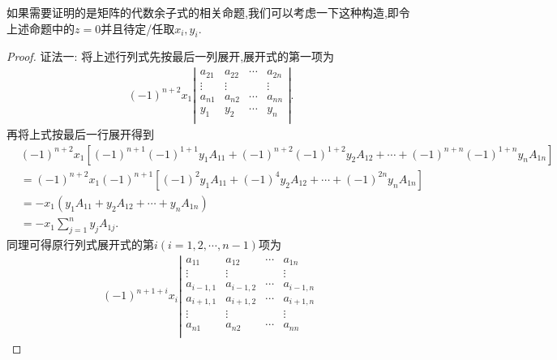 \documentclass[lang=cn,newtx,10pt,scheme=chinese]{elegantbook}
\begin{document}
\begin{remark}
如果需要证明的是矩阵的代数余子式的相关命题,我们可以考虑一下这种构造,即令上述命题中的$z=0$并且待定/任取$x_i,y_i$.
\end{remark}
\begin{proof}
{\color{blue}证法一:}
将上述行列式先按最后一列展开,展开式的第一项为
\begin{equation}
\begin{split}
\left( -1 \right) ^{n+2}x_1\left| \begin{matrix}
a_{21}&		a_{22}&		\cdots&		a_{2n}\\
\vdots&		\vdots&		&		\vdots\\
a_{n1}&		a_{n2}&		\cdots&		a_{nn}\\
y_1&		y_2&		\cdots&		y_n\\
\end{matrix} \right|.
\end{split}
\nonumber
\end{equation}
再将上式按最后一行展开得到
\begin{equation}
\begin{split}
&\left( -1 \right) ^{n+2}x_1\left[ \left( -1 \right) ^{n+1}\left( -1 \right) ^{1+1}y_1A_{11}+\left( -1 \right) ^{n+2}\left( -1 \right) ^{1+2}y_2A_{12}+\cdots +\left( -1 \right) ^{n+n}\left( -1 \right) ^{1+n}y_nA_{1n} \right]
\\
&=\left( -1 \right) ^{n+2}x_1\left( -1 \right) ^{n+1}\left[ \left( -1 \right) ^2y_1A_{11}+\left( -1 \right) ^4y_2A_{12}+\cdots +\left( -1 \right) ^{2n}y_nA_{1n} \right] 
\\
&=-x_1\left( y_1A_{11}+y_2A_{12}+\cdots +y_nA_{1n} \right)
\\
&=-x_1\sum_{j=1}^n{y_jA_{1j}}.            
\end{split}
\nonumber
\end{equation}
同理可得原行列式展开式的第$i(i=1,2,\cdots,n-1)$项为
\begin{equation}
\begin{split}
\left( -1 \right) ^{n+1+i}x_i\left| \begin{matrix}
a_{11}&		a_{12}&		\cdots&		a_{1n}\\
\vdots&		\vdots&		&		\vdots\\
a_{i-1,1}&		a_{i-1,2}&		\cdots&		a_{i-1,n}\\
a_{i+1,1}&		a_{i+1,2}&		\cdots&		a_{i+1,n}\\
\vdots&		\vdots&		&		\vdots\\
a_{n1}&		a_{n2}&		\cdots&		a_{nn}\\

\end{matrix}
\end{split}
\end{equation}
\end{proof}
\end{document}
